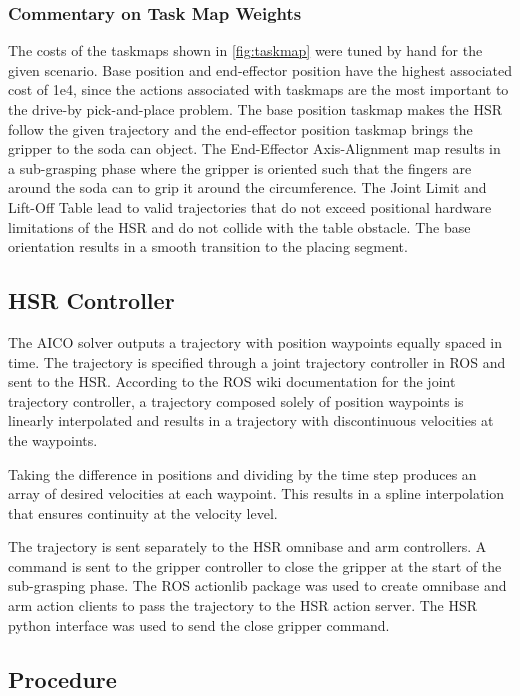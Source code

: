 \documentclass[12pt]{article}
\begin{document}
            \subsubsection{Commentary on Task Map Weights}
                The costs of the taskmaps shown in \cref{fig:taskmap} were tuned by hand for the given scenario. Base position and end-effector position have the highest associated cost of 1e4, since the actions associated with taskmaps are the most important to the drive-by pick-and-place problem. The base position taskmap makes the HSR follow the given trajectory and the end-effector position taskmap brings the gripper to the soda can object. The End-Effector Axis-Alignment map results in a sub-grasping phase where the gripper is oriented such that the fingers are around the soda can to grip it around the circumference. The Joint Limit and Lift-Off Table lead to valid trajectories that do not exceed positional hardware limitations of the HSR and do not collide with the table obstacle. The base orientation results in a smooth transition to the placing segment.
        \subsection{HSR Controller}
            The AICO solver outputs a trajectory with position waypoints equally spaced in time. The trajectory is specified through a joint trajectory controller in ROS and sent to the HSR. According to the ROS wiki documentation for the joint trajectory controller, a trajectory composed solely of position waypoints is linearly interpolated and results in a trajectory with discontinuous velocities at the waypoints. 
            \par Taking the difference in positions and dividing by the time step produces an array of desired velocities at each waypoint. This results in a spline interpolation that ensures continuity at the velocity level. 

            \par The trajectory is sent separately to the HSR omnibase and arm controllers. A command is sent to the gripper controller to close the gripper at the start of the sub-grasping phase. The ROS actionlib package was used to create omnibase and arm action clients to pass the trajectory to the HSR action server. The HSR python interface was used to send the close gripper command.

        \subsection{Procedure}
\end{document}
